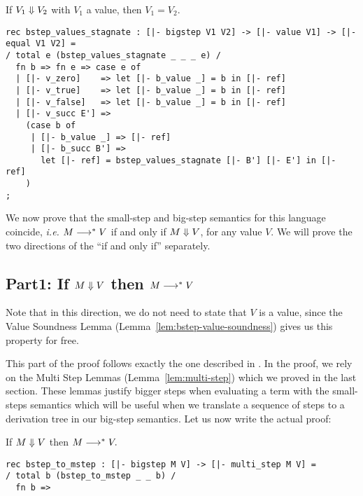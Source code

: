 \begin{lemma}
  \label{lem:bstep-values-stagnate}
  If $V_1 \Downarrow V_2$ with $V_1$ a value, then $V_1 = V_2$.
\end{lemma}

\begin{lstlisting}
rec bstep_values_stagnate : [|- bigstep V1 V2] -> [|- value V1] -> [|- equal V1 V2] =
/ total e (bstep_values_stagnate _ _ _ e) /
  fn b => fn e => case e of 
  | [|- v_zero]    => let [|- b_value _] = b in [|- ref]
  | [|- v_true]    => let [|- b_value _] = b in [|- ref]
  | [|- v_false]   => let [|- b_value _] = b in [|- ref]
  | [|- v_succ E'] =>
    (case b of 
     | [|- b_value _] => [|- ref]
     | [|- b_succ B'] =>
       let [|- ref] = bstep_values_stagnate [|- B'] [|- E'] in [|- ref]
    )
;
\end{lstlisting}

We now prove that the small-step and big-step semantics for this language
coincide, {\em i.e.} $M \longrightarrow^* V$ if and only if $M \Downarrow V$, for any value
 $V$. We will prove the two directions of the ``if and only if'' separately.

\subsection{Part1: If $M \Downarrow V$ then $M \longrightarrow^* V$}

Note that in this direction, we do not need to state that $V$ is a value, since
the Value Soundness Lemma (Lemma~\ref{lem:bstep-value-soundness}) gives us this
property for free.

This part of the proof follows exactly the one described in \cite{TAPL}. In the
proof, we rely on the Multi Step Lemmas (Lemma~\ref{lem:multi-step}) which we
proved in the last section. These lemmas justify bigger steps when evaluating a
term with the small-steps semantics which will be useful when we translate a
sequence of steps to a derivation tree in our big-step semantics. Let us now
write the actual proof:

\begin{proposition}
  \label{prop:bstep-to-mstep}
  If $M \Downarrow V$ then $M \longrightarrow^* V.$
  \em
  \begin{lstlisting}
rec bstep_to_mstep : [|- bigstep M V] -> [|- multi_step M V] =
/ total b (bstep_to_mstep _ _ b) /
  fn b =>
  \end{lstlisting}
\end{proposition}

